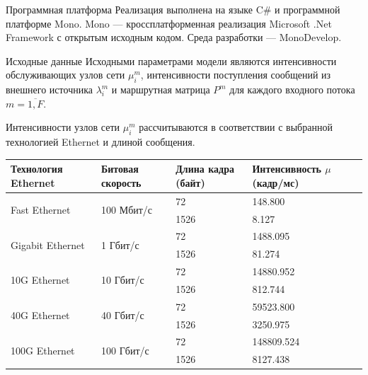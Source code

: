 \documentclass[aspectratio=43]{beamer}
\begin{document}
\begin{frame}

\begin{block}{Программная платформа}
Реализация выполнена на языке C\# и программной платформе Mono.
Mono --- кроссплатформенная реализация Microsoft .Net Framework с открытым исходным кодом.
Среда разработки --- MonoDevelop.
\end{block}
\end{frame}

\begin{frame}

\begin{block}{Исходные данные}
Исходными параметрами модели являются интенсивности обслуживающих узлов сети \( \mu_{i}^{m} \), интенсивности поступления сообщений из внешнего источника
\( \lambda_{i}^{m} \) и маршрутная матрица \( P^{m} \) для каждого входного потока \( m = \overline{1, F} \).

Интенсивности узлов сети \( \mu_{i}^{m} \) рассчитываются в соответствии с выбранной технологией Ethernet и длиной сообщения.
\end{block}
\end{frame}

\begin{frame}

\begin{tabular}{|p{}|p{}|p{}|p{}|}
	\hline Технология Ethernet & Битовая скорость & Длина кадра (байт) & Интенсивность \( \mu \) (кадр/мс) \\
	\hline \multirow{2}{*}{Fast Ethernet} 	& \multirow{2}{*}{100 Мбит/с} 	& 72 	& 148.800 \\
	\hhline{~~--}				  			& \multirow{2}{*}{}           	& 1526 	& 8.127 \\ 
	
	\hline \multirow{2}{*}{Gigabit Ethernet} 	& \multirow{2}{*}{1 Гбит/с} 		& 72 	& 1488.095 \\
	\hhline{~~--}				  			& \multirow{2}{*}{}           	& 1526 	& 81.274 \\ 
	
	\hline \multirow{2}{*}{10G Ethernet} 		& \multirow{2}{*}{10 Гбит/с} 	& 72 	& 14880.952 \\
	\hhline{~~--}				  			& \multirow{2}{*}{}           	& 1526 	& 812.744 \\ 
	
	\hline \multirow{2}{*}{40G Ethernet} 		& \multirow{2}{*}{40 Гбит/с} 	& 72 	& 59523.800 \\
	\hhline{~~--}				  			& \multirow{2}{*}{}           	& 1526 	& 3250.975 \\ 
	
	\hline \multirow{2}{*}{100G Ethernet} 	& \multirow{2}{*}{100 Гбит/с} 	& 72 	& 148809.524 \\
	\hhline{~~--}				  			& \multirow{2}{*}{}           	& 1526 	& 8127.438 \\
	\hline
\end{tabular}
\end{frame}
\end{document}
